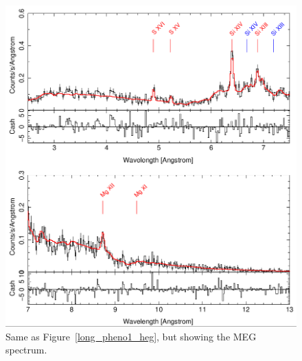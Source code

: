 \begin{figure}[t]
    \centering
        \includegraphics[width = \linewidth]{Chapters/Figures/long_pheno1_meg.png}
        \caption{Same as Figure~\ref{long_pheno1_heg}, but showing the MEG spectrum.}
    \label{long_pheno1_meg}
\end{figure}


